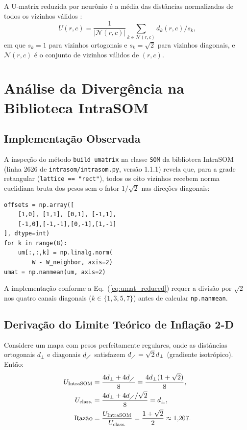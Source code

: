 \documentclass[10pt,journal,compsoc,twocolumn]{IEEEtran}
\begin{document}
A U-matrix reduzida por neur\^onio \'e a m\'edia das dist\^ancias
normalizadas de todos os vizinhos v\'alidos \cite{vesanto2000clustering,
flexer2001use}:
\begin{equation}
    U(r,c) = \frac{1}{|\mathcal{N}(r,c)|} \sum_{k \in \mathcal{N}(r,c)}
    d_k(r,c) / s_k,
    \label{eq:umat_reduced}
\end{equation}
em que $s_k = 1$ para vizinhos ortogonais e $s_k = \sqrt{2}$ para vizinhos
diagonais, e $\mathcal{N}(r,c)$ \'e o conjunto de vizinhos v\'alidos de
$(r,c)$.

\section{An\'alise da Diverg\^encia na Biblioteca IntraSOM}
\label{sec:divergencia}

\subsection{Implementa\c{c}\~ao Observada}
A inspe\c{c}\~ao do m\'etodo \texttt{build\_umatrix} na classe \texttt{SOM}
da biblioteca IntraSOM (linha 2626 de \texttt{intrasom/intrasom.py},
vers\~ao 1.1.1) \cite{gouvea2023intrasom} revela que, para a grade retangular
(\texttt{lattice == "rect"}), todos os oito vizinhos recebem norma
euclidiana bruta dos pesos sem o fator $1/\sqrt{2}$ nas dire\c{c}\~oes
diagonais:
\begin{verbatim}
offsets = np.array([
    [1,0], [1,1], [0,1], [-1,1],
    [-1,0],[-1,-1],[0,-1],[1,-1]
], dtype=int)
for k in range(8):
    um[:,:,k] = np.linalg.norm(
        W - W_neighbor, axis=2)
umat = np.nanmean(um, axis=2)
\end{verbatim}

A implementa\c{c}\~ao conforme a Eq.~(\ref{eq:umat_reduced}) requer a
divis\~ao por $\sqrt{2}$ nos quatro canais diagonais ($k \in \{1, 3, 5, 7\}$)
antes de calcular \texttt{np.nanmean}.

\subsection{Deriva\c{c}\~ao do Limite Te\'orico de Infla\c{c}\~ao 2-D}
\label{subsec:fator}
Considere um mapa com pesos perfeitamente regulares, onde as dist\^ancias
ortogonais $d_{\perp}$ e diagonais $d_{\diagup}$ satisfazem
$d_{\diagup} = \sqrt{2} \, d_{\perp}$ (gradiente isotr\'opico). Ent\~ao:
\begin{align*}
    U_{\text{IntraSOM}} &= \frac{4 d_{\perp} + 4 d_{\diagup}}{8}
    = \frac{4 d_{\perp}(1 + \sqrt{2})}{8},\\
    U_{\text{class.}} &= \frac{4 d_{\perp} + 4 d_{\diagup}/\sqrt{2}}{8}
    = d_{\perp},\\
    \text{Raz\~ao} &= \frac{U_{\text{IntraSOM}}}{U_{\text{class.}}}
    = \frac{1 + \sqrt{2}}{2} \approx 1{,}207.
\end{align*}
\end{document}
